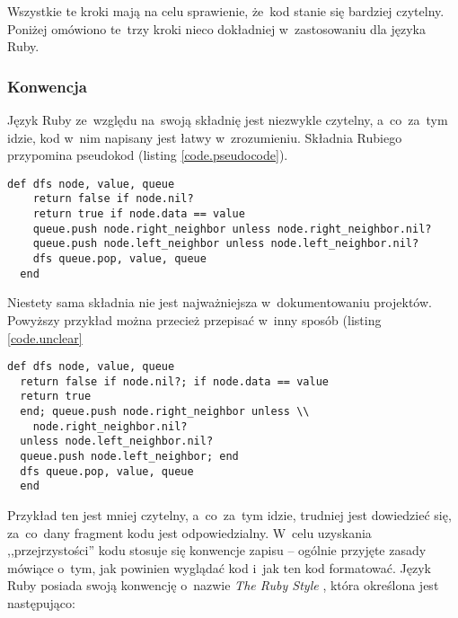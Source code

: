 Wszystkie te kroki mają na celu sprawienie, że~kod stanie się bardziej czytelny. Poniżej omówiono te~trzy kroki nieco dokładniej w~zastosowaniu dla języka Ruby.

\subsubsection{Konwencja} \label{dokumentacja.konwencja}

Język Ruby ze~względu na~swoją składnię jest niezwykle czytelny, a~co~za~tym idzie, kod w~nim napisany jest łatwy w~zrozumieniu. Składnia Rubiego przypomina pseudokod (listing \ref{code.pseudocode}).

  \begin{lstlisting}[label={code.pseudocode}]
  def dfs node, value, queue
    return false if node.nil?
    return true if node.data == value
    queue.push node.right_neighbor unless node.right_neighbor.nil?
    queue.push node.left_neighbor unless node.left_neighbor.nil?
    dfs queue.pop, value, queue
  end
  \end{lstlisting}

Niestety sama składnia nie jest najważniejsza w~dokumentowaniu projektów. Powyższy przykład można przecież przepisać w~inny sposób (listing \ref{code.unclear}

  \begin{lstlisting}[label={code.unclear}]
  def dfs node, value, queue
  return false if node.nil?; if node.data == value
  return true
  end; queue.push node.right_neighbor unless \\
    node.right_neighbor.nil?
  unless node.left_neighbor.nil?
  queue.push node.left_neighbor; end
  dfs queue.pop, value, queue
  end
  \end{lstlisting}

Przykład ten jest mniej czytelny, a~co~za~tym idzie, trudniej jest dowiedzieć się, za~co~dany fragment kodu jest odpowiedzialny. W~celu uzyskania ,,przejrzystości'' kodu stosuje się konwencje zapisu -- ogólnie przyjęte zasady mówiące o~tym, jak powinien wyglądać kod i~jak ten kod formatować. Język Ruby posiada swoją konwencję o~nazwie \textit{The Ruby Style} \cite{therubyway}, która określona jest następująco:

